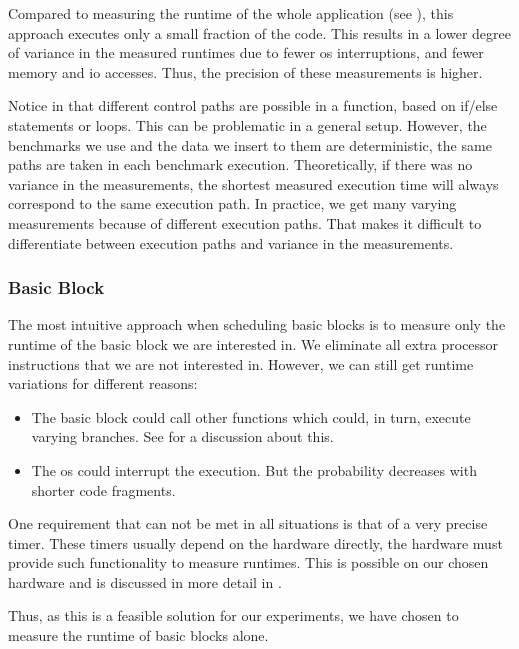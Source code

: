 Compared to measuring the runtime of the whole application (see ), this approach executes only a small fraction of the code.
This results in a lower degree of variance in the measured runtimes due to fewer \ac{os} interruptions, and fewer memory and \ac{io} accesses.
Thus, the precision of these measurements is higher.

Notice in  that different control paths are possible in a function, based on if/else statements or loops.
This can be problematic in a general setup.
However, the benchmarks we use and the data we insert to them are deterministic, \ie the same paths are taken in each benchmark execution.
Theoretically, if there was no variance in the measurements, the shortest measured execution time will always correspond to the same execution path.
In practice, we get many varying measurements because of different execution paths.
That makes it difficult to differentiate between execution paths and variance in the measurements.

\subsubsection{Basic Block}
The most intuitive approach when scheduling basic blocks is to measure only the runtime of the basic block we are interested in.
We eliminate all extra processor instructions that we are not interested in.
However, we can still get runtime variations for different reasons:
\begin{itemize}
    \item The basic block could call other functions which could, in turn, execute varying branches. 
          See  for a discussion about this.
    \item The \ac{os} could interrupt the execution. 
          But the probability decreases with shorter code fragments.
\end{itemize}

One requirement that can not be met in all situations is that of a very precise timer.
These timers usually depend on the hardware directly, \ie the hardware must provide such functionality to measure runtimes.
This is possible on our chosen hardware and is discussed in more detail in .

Thus, as this is a feasible solution for our experiments, we have chosen to measure the runtime of basic blocks alone.
    
